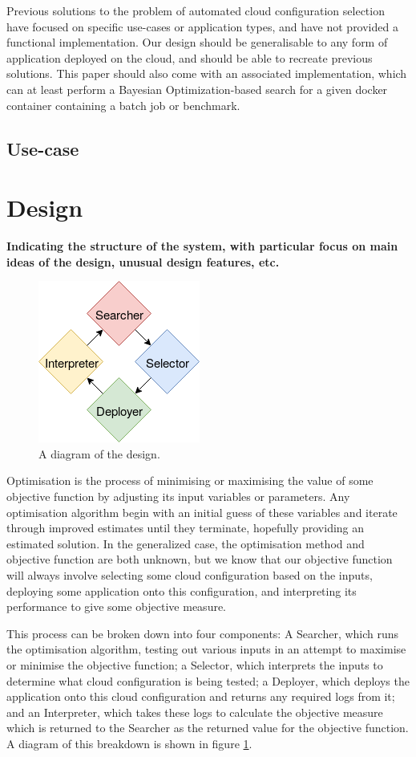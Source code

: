 \documentclass{article}
\begin{document}
Previous solutions to the problem of automated cloud configuration selection have focused on specific use-cases or application types, and have not provided a functional implementation.  Our design should be generalisable to any form of application deployed on the cloud, and should be able to recreate previous solutions. This paper should also come with an associated implementation, which can at least perform a Bayesian Optimization-based search for a given docker container containing a batch job or benchmark.


\subsection{Use-case}
\section{Design}
\textbf{Indicating the structure of the system, with particular
focus on main ideas of the design, unusual design
features, etc. \\}
\begin{figure}[!ht]
  \caption{A diagram of the design.}
  \label{fig:design}
  \centering
   \includegraphics[scale=0.8]{Design}
\end{figure}

Optimisation is the process of minimising or maximising the value of some objective function by adjusting its input variables or parameters. Any optimisation algorithm begin with an initial guess of these variables and iterate through improved estimates until they terminate, hopefully providing an estimated solution. \cite{Nocedal2006} In the generalized case, the optimisation method and objective function are both unknown, but we know that our objective function will always involve selecting some cloud configuration based on the inputs, deploying some application onto this configuration, and interpreting its performance to give some objective measure.

This process can be broken down into four components: A Searcher, which runs the optimisation algorithm, testing out various inputs in an attempt to maximise or minimise the objective function; a Selector, which interprets the inputs to determine what cloud configuration is being tested; a Deployer, which deploys the application onto this cloud configuration and returns any required logs from it; and an Interpreter, which takes these logs to calculate the objective measure which is returned to the Searcher as the returned value for the objective function. A diagram of this breakdown is shown in figure \ref{fig:design}.
\end{document}
